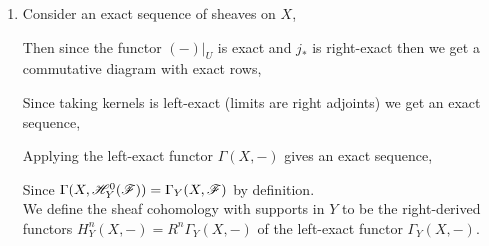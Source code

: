 \documentclass[12pt]{article}
\begin{document}
\begin{enumerate}
\item Consider an exact sequence of sheaves on $X$,
\begin{center}
\end{center}
Then since the functor $(-)|_U$ is exact and $j_*$ is right-exact then we get a commutative diagram with exact rows,
\begin{center}
\end{center}
Since taking kernels is left-exact (limits are right adjoints) we get an exact sequence,
\begin{center}
\end{center}
Applying the left-exact functor $\Gamma(X, -)$ gives an exact sequence,
\begin{center}
\end{center}
Since $\Gamma(X, \mathscr{H}^0_Y(\mathscr{F})) = \Gamma_Y(X, \mathscr{F})$ by definition. 
\bigskip\\
We define the sheaf cohomology with supports in $Y$ to be the right-derived functors $H^n_Y(X, -) = R^n \Gamma_Y(X, -)$ of the left-exact functor $\Gamma_Y(X, -)$. 


\end{enumerate}
\end{document}
